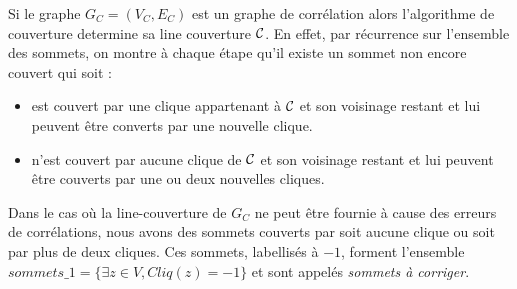 %
%
% 
%
%
%
% 
%

Si le graphe $G_C=(V_C, E_C)$ est un graphe de corr\'elation alors l'algorithme de couverture determine sa line couverture $\cal C$.
En effet, par r\'ecurrence sur l'ensemble des sommets, on montre \`a chaque \'etape qu'il existe un sommet non encore couvert qui soit :
\begin{itemize}
\item  est couvert par une clique appartenant \`a $\cal C$ et son voisinage restant et lui peuvent \^etre converts par une nouvelle clique.
\item n'est couvert par aucune clique de  $\cal C$ et son voisinage restant et lui peuvent \^etre couverts par une ou deux nouvelles cliques.
\end{itemize}
Dans le cas o\`u la line-couverture de $G_C$ ne peut \^etre fournie \`a cause des erreurs de corr\'elations, nous avons des sommets couverts par soit aucune clique ou soit par plus de deux cliques. Ces sommets, labellis\'es \`a $-1$, forment l'ensemble 
$sommets\_1 = \{\exists z \in V, Cliq(z) = -1 \}$ 
et sont appel\'es {\em sommets \`a corriger}.
\newline

